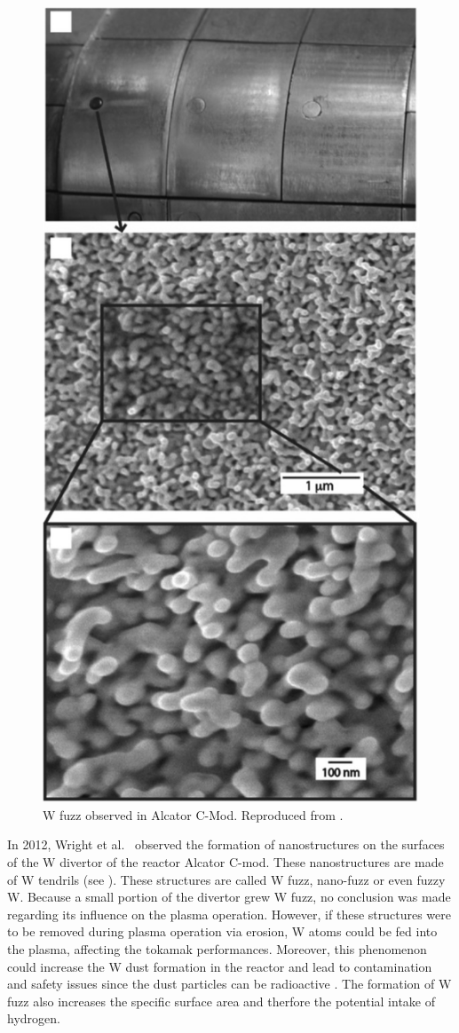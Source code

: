 \begin{figure} [h!]
    \centering
    \includegraphics[width=0.5\linewidth]{Figures/Chapter1/fuzz_alcator_wright.jpg}
    \caption{W fuzz observed in Alcator C-Mod. Reproduced from \cite{wright_tungsten_2012}.}
\end{figure}

In 2012, Wright et al.\  observed the formation of nanostructures on the surfaces of the \gls{W} divertor of the reactor Alcator C-mod.
These nanostructures are made of \gls{W} \glspl{tendril} (see ).
These structures are called \gls{W} \gls{fuzz}, nano-fuzz or even fuzzy \gls{W}.
Because a small portion of the \gls{divertor} grew \gls{W} \gls{fuzz}, no conclusion was made regarding its influence on the \gls{plasma} operation.
However, if these structures were to be removed during \gls{plasma} operation via erosion, \gls{W} atoms could be fed into the \gls{plasma}, affecting the \gls{tokamak} performances.
Moreover, this phenomenon could increase the \gls{W} dust formation in the reactor and lead to contamination and safety issues since the dust particles can be radioactive .
The formation of \gls{W} \gls{fuzz} also increases the specific surface area and therfore the potential intake of hydrogen.

